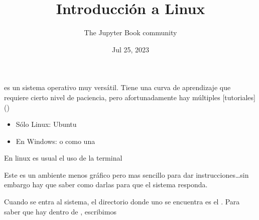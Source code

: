 \documentclass[letterpaper,10pt,english]{jupyterBook}
\title{Introducción a Linux}
\date{Jul 25, 2023}
\author{The Jupyter Book community}
\begin{document}
\pagestyle{empty}
\sphinxmaketitle
\pagestyle{plain}
\sphinxtableofcontents
\pagestyle{normal}
\label{\detokenize{intro_linux::doc}}


\begin{DUlineblock}{0em}
\item[] 
\end{DUlineblock}

\sphinxAtStartPar
{} es un sistema operativo muy versátil. Tiene una curva de aprendizaje que requiere cierto nivel de paciencia, pero afortunadamente hay múltiples {[}tutoriales{]}
()

\begin{DUlineblock}{0em}
\item[] 
\end{DUlineblock}
\begin{itemize}
\item {} 
\sphinxAtStartPar
Sólo Linux: Ubuntu

\item {} 
\sphinxAtStartPar
En Windows: 
o como una 

\end{itemize}

\begin{DUlineblock}{0em}
\item[] 
\end{DUlineblock}

\sphinxAtStartPar
En linux es usual el uso de la terminal



\sphinxAtStartPar
Este es un ambiente menos gráfico pero mas sencillo para dar instrucciones…sin embargo hay que saber como darlas para que el sistema responda.

\begin{DUlineblock}{0em}
\item[] 
\end{DUlineblock}

\sphinxAtStartPar
Cuando se entra al sistema, el directorio donde uno se encuentra es el . Para saber que hay dentro de , escribimos
\end{document}
